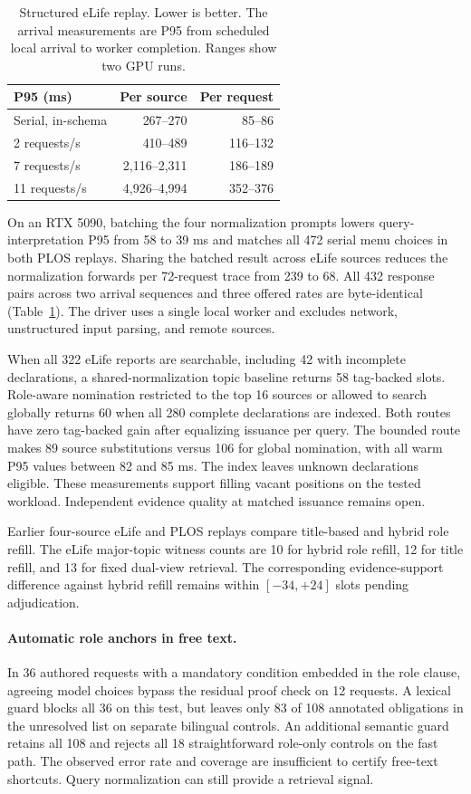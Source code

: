 \begin{table}[t]
\caption{Structured eLife replay. Lower is better. The arrival measurements are P95 from scheduled local arrival to worker completion. Ranges show two GPU runs.}
\label{tab:normalization}
\centering\small
\begin{tabular}{@{}lrr@{}}\toprule
P95 (ms) & Per source & Per request \\\midrule
Serial, in-schema & 267--270 & 85--86 \\
2 requests/s & 410--489 & 116--132 \\
7 requests/s & 2,116--2,311 & 186--189 \\
11 requests/s & 4,926--4,994 & 352--376 \\\bottomrule
\end{tabular}
\end{table}

On an RTX 5090, batching the four normalization prompts lowers query-interpretation P95 from 58 to 39 ms and matches all 472 serial menu choices in both PLOS replays. Sharing the batched result across eLife sources reduces the normalization forwards per 72-request trace from 239 to 68. All 432 response pairs across two arrival sequences and three offered rates are byte-identical (Table~\ref{tab:normalization}). The driver uses a single local worker and excludes network, unstructured input parsing, and remote sources.

When all 322 eLife reports are searchable, including 42 with incomplete declarations, a shared-normalization topic baseline returns 58 tag-backed slots. Role-aware nomination restricted to the top 16 sources or allowed to search globally returns 60 when all 280 complete declarations are indexed. Both routes have zero tag-backed gain after equalizing issuance per query. The bounded route makes 89 source substitutions versus 106 for global nomination, with all warm P95 values between 82 and 85 ms. The index leaves unknown declarations eligible. These measurements support filling vacant positions on the tested workload. Independent evidence quality at matched issuance remains open.

Earlier four-source eLife and PLOS replays compare title-based and hybrid role refill. The eLife major-topic witness counts are 10 for hybrid role refill, 12 for title refill, and 13 for fixed dual-view retrieval. The corresponding evidence-support difference against hybrid refill remains within $[-34,+24]$ slots pending adjudication.

\paragraph{Automatic role anchors in free text.}
In 36 authored requests with a mandatory condition embedded in the role clause, agreeing model choices bypass the residual proof check on 12 requests. A lexical guard blocks all 36 on this test, but leaves only 83 of 108 annotated obligations in the unresolved list on separate bilingual controls. An additional semantic guard retains all 108 and rejects all 18 straightforward role-only controls on the fast path. The observed error rate and coverage are insufficient to certify free-text shortcuts. Query normalization can still provide a retrieval signal.


